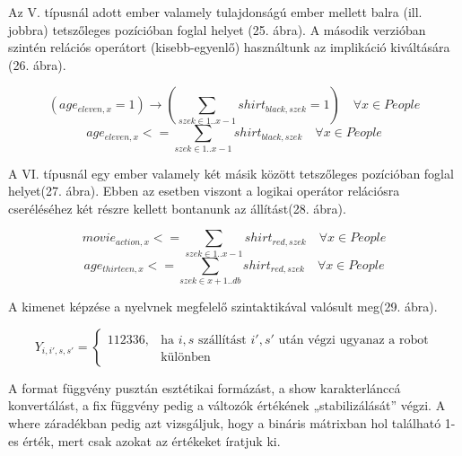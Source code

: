 \documentclass[12pt,a4paper,twoside, openright]{report}
\begin{document}
    Az V. típusnál adott ember valamely tulajdonságú ember mellett balra (ill. jobbra) tetszőleges pozícióban foglal helyet (25. ábra).
    A második verzióban szintén relációs operátort (kisebb-egyenlő) használtunk az implikáció kiváltására (26. ábra).

    \begin{equation}
    (age_{eleven,x}=1) \rightarrow (\sum_{ szek \in 1..x-1 } shirt_{black,szek}=1) \quad \forall x \in People
    \end{equation}
    \begin{equation}
    age_{eleven,x} <= \sum_{szek \in 1..x-1} shirt_{black,szek} \quad \forall x \in People
     \end{equation}

    A VI. típusnál egy ember valamely két másik között tetszőleges pozícióban foglal helyet(27. ábra).
    Ebben az esetben viszont a logikai operátor relációsra cseréléséhez két részre kellett bontanunk az állítást(28. ábra).

    
   \begin{equation}
   movie_{action,x} <= \sum_{szek\in 1..x-1} shirt_{red,szek} \quad \forall x \in People
    \end{equation}
   \begin{equation}
   age_{thirteen,x} <= \sum_{szek\in x+1..db} shirt_{red,szek} \quad \forall x \in People
   \end{equation}

    A kimenet képzése a nyelvnek megfelelő szintaktikával valósult meg(29. ábra).

    \begin{equation}
    Y_{i,i',s,s'} =
    \left\lbrace
    \begin{array}{rl}
        112336, &\mbox{ha $i,s$ szállítást $i',s'$ után végzi ugyanaz a robot} \\
         &\mbox{különben}
    \end{array}
    \right. \nonumber
    \end{equation}

    A format függvény pusztán esztétikai formázást, a show karakterlánccá konvertálást, a fix függvény pedig a változók értékének „stabilizálását” végzi.
    A where záradékban pedig azt vizsgáljuk, hogy a bináris mátrixban hol található 1-es érték, mert csak azokat az értékeket íratjuk ki.
\end{document}

